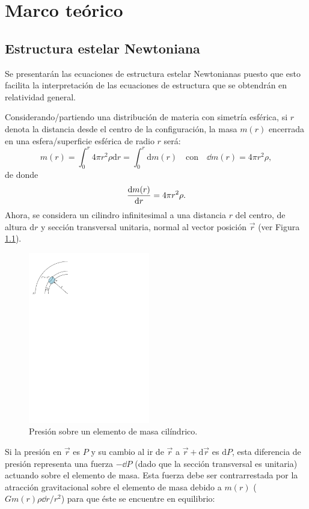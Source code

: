 \chapter{Marco teórico}
\section{Estructura estelar Newtoniana}
Se presentarán las ecuaciones de estructura estelar Newtonianas puesto que esto facilita la interpretación de las ecuaciones de estructura que se obtendrán en relatividad general.

Considerando/partiendo una distribución de materia con simetría esférica, si $r$ denota la distancia desde el centro de la configuración, la masa $m(r)$ encerrada en una esfera/superficie esférica de radio $r$ será:  
\begin{equation}
    m ( r ) = \int _ { 0 } ^ { r } 4 \pi r ^ { 2 } \rho \mathrm{d} r = \int_{0}^{r} \mathrm{d}m(r) \quad\text{con}\quad \dd{m(r)}=4\pi r^2\rho,
\end{equation}
de donde
\begin{equation}
    \dv{m(r)}{r} =4\pi r^2 \rho.
    \label{dmnewton}
\end{equation}
Ahora, se considera un cilindro infinitesimal a una distancia $r$ del centro, de altura $\mathrm{d}r$ y sección transversal unitaria, normal al vector posición $\vec{r}$ (ver Figura \ref{stellnew}).   

\begin{figure}[H]
    \centering
    \includegraphics[width=150pt]{figures/stellarnewton.pdf}
    \caption{Presión sobre un elemento de masa cilíndrico.}
    \label{stellnew}
\end{figure}
Si la presión en $\vec{r}$ es $P$ y su cambio al ir de $\vec{r}$ a $\vec{r}+\mathrm{d}\vec{r}$ es $\mathrm{d}P$, esta diferencia de presión representa una fuerza $-\dd P$ (dado que la sección transversal es unitaria) actuando sobre el elemento de masa. Esta fuerza debe ser contrarrestada por la atracción gravitacional sobre el elemento de masa debido a $m(r)$ ($G m(r) \rho \dd r/r^2$) para que éste se encuentre en equilibrio:

